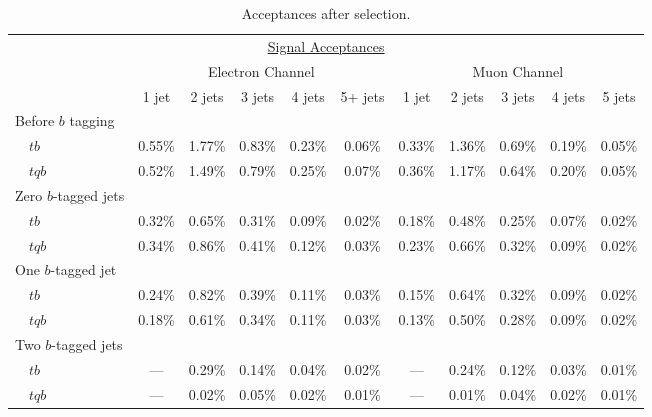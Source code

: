 \vspace{0.2in}
\begin{table}[!h!tbp]
\begin{center}
\begin{minipage}{6.5in}
\begin{ruledtabular}
\begin{tabular}{l||ccccc|ccccc}
\multicolumn{11}{c}{\hspace{1in}\underline{Signal Acceptances}}\vspace{0.1in} \\
& \multicolumn{5}{c|}{Electron Channel} & \multicolumn{5}{c}{Muon Channel} \\
                     & 1 jet & 2 jets & 3 jets & 4 jets & 5+ jets
                     & 1 jet & 2 jets & 3 jets & 4 jets & 5 jets \\
\hline
Before $b$ tagging   &        &        &        &        &        &        &        &        &        &        \\
~~$tb$               & 0.55\% & 1.77\% & 0.83\% & 0.23\% & 0.06\% & 0.33\% & 1.36\% & 0.69\% & 0.19\% & 0.05\% \\
~~$tqb$              & 0.52\% & 1.49\% & 0.79\% & 0.25\% & 0.07\% & 0.36\% & 1.17\% & 0.64\% & 0.20\% & 0.05\% \\
Zero $b$-tagged jets &        &        &        &        &        &        &        &        &        &        \\
~~$tb$               & 0.32\% & 0.65\% & 0.31\% & 0.09\% & 0.02\% & 0.18\% & 0.48\% & 0.25\% & 0.07\% & 0.02\% \\
~~$tqb$              & 0.34\% & 0.86\% & 0.41\% & 0.12\% & 0.03\% & 0.23\% & 0.66\% & 0.32\% & 0.09\% & 0.02\% \\
One $b$-tagged jet   &        &        &        &        &        &        &        &        &        &        \\
~~$tb$               & 0.24\% & 0.82\% & 0.39\% & 0.11\% & 0.03\% & 0.15\% & 0.64\% & 0.32\% & 0.09\% & 0.02\% \\
~~$tqb$              & 0.18\% & 0.61\% & 0.34\% & 0.11\% & 0.03\% & 0.13\% & 0.50\% & 0.28\% & 0.09\% & 0.02\% \\
Two $b$-tagged jets  &        &        &        &        &        &        &        &        &        &        \\
~~$tb$               &  ---   & 0.29\% & 0.14\% & 0.04\% & 0.02\% &  ---   & 0.24\% & 0.12\% & 0.03\% & 0.01\% \\
~~$tqb$              &  ---   & 0.02\% & 0.05\% & 0.02\% & 0.01\% &  ---   & 0.01\% & 0.04\% & 0.02\% & 0.01\%
\end{tabular}
\end{ruledtabular}
\vspace{-0.1in}
\caption[acceptances]{Acceptances after selection.}
\label{acceptances}
\end{minipage}
\end{center}
\end{table}

